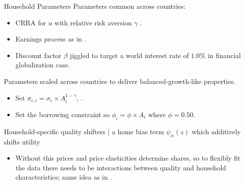 \documentclass[9pt,pdftex,aspectratio=1610]{beamer}
\theoremstyle{definition}
\begin{document}

\begin{frame}[t]{Household Parameters}
\smallskip
Parameters common across countries:
\begin{itemize}
\smallskip
\item CRRA for $u$ with relative risk aversion $\gamma$ . \\
\smallskip
\item Earnings process as in \citet*{krueger2016macroeconomics}.
\smallskip
\item Discount factor $\beta$ jiggled to target a world interest rate of $1.0 \%$ in financial globalization case.
\end{itemize}
\bigskip
Parameters scaled across countries to deliver balanced-growth-like properties.
\begin{itemize}
\smallskip
\item Set $\sigma_{\epsilon,i} = \sigma_{\epsilon}\times A_i^{1-\gamma}$, .
\medskip
\item Set the borrowing constraint so $\phi_{i} = \phi \times A_i$ where $\phi = 0.50$.  
\end{itemize}
\bigskip
Household-specific quality shifters | a home bias term $\psi_{ii}(z)$ which additively shifts utility
\begin{itemize}
\smallskip
\item Without this prices and price elasticities determine shares, so to flexibly fit the data there needs to be interactions between quality and household characteristics; same idea as in \citet{berry1995automobile}.
\smallskip
{}
\end{itemize}
\end{frame}

\end{document}
